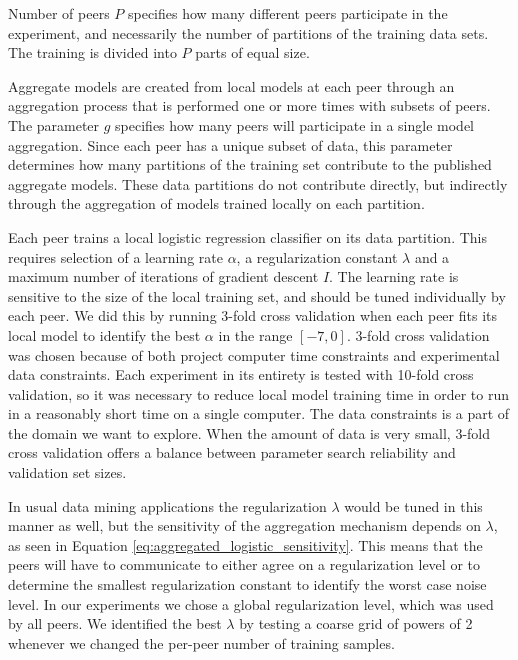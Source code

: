 Number of peers $P$ specifies how many different peers participate in the experiment, and necessarily the number of partitions of the training data sets. The training is divided into $P$ parts of equal size.


Aggregate models are created from local models at each peer through an aggregation process that is performed one or more times with subsets of peers. The parameter $g$ specifies how many peers will participate in a single model aggregation. Since each peer has a unique subset of data, this parameter determines how many partitions of the training set contribute to the published aggregate models. These data partitions do not contribute directly, but indirectly through the aggregation of models trained locally on each partition.

Each peer trains a local logistic regression classifier on its data partition. This requires selection of a learning rate $\alpha$, a regularization constant $\lambda$ and a maximum number of iterations of gradient descent $I$. The learning rate is sensitive to the size of the local training set\cite{wilson20013learningrate}, and should be tuned individually by each peer. We did this by running 3-fold cross validation when each peer fits its local model to identify the best $\alpha$ in the range $[-7, 0]$. 3-fold cross validation was chosen because of both project computer time constraints and experimental data constraints. Each experiment in its entirety is tested with 10-fold cross validation, so it was necessary to reduce local model training time in order to run in a reasonably short time on a single computer. The data constraints is a part of the domain we want to explore. When the amount of data is very small, 3-fold cross validation offers a balance between parameter search reliability and validation set sizes.

In usual data mining applications the regularization $\lambda$ would be tuned in this manner as well, but the sensitivity of the aggregation mechanism depends on $\lambda$, as seen in Equation \ref{eq:aggregated_logistic_sensitivity}. This means that the peers will have to communicate to either agree on a regularization level or to determine the smallest regularization constant to identify the worst case noise level. In our experiments we chose a global regularization level, which was used by all peers. We identified the best $\lambda$ by testing a coarse grid of powers of 2 whenever we changed the per-peer number of training samples. 

